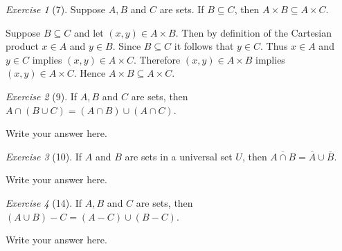 \documentclass[12pt]{amsart}
\makeatletter
\theoremstyle{remark}
\newtheorem*{exercise}{Exercise}%
\renewenvironment{proof}[1][\proofname]{\par\doublespacing
  \pushQED{\qed}%
  \normalfont \topsep6\p@\@plus6\p@\relax
  \list{}{%
    \settowidth{\leftmargin}{\itshape\proofname:\hskip\labelsep}%
    \setlength{\labelwidth}{0pt}%
    \setlength{\itemindent}{-\leftmargin}%
  }%
  \item[\hskip\labelsep\itshape#1\@addpunct{:}]\ignorespaces
}{%
  \popQED\endlist\@endpefalse
  \singlespacing
}
\theoremstyle{mycomment}
\makeatother
\begin{document}
\begin{exercise}[7] Suppose $A,B$ and $C$ are sets. If $B\subseteq C$, then $A\times B\subseteq A\times C$.
\begin{proof}
Suppose $B \subseteq C$ and let $(x,y) \in A \times B$. Then by definition of the Cartesian product $x \in A$ and $y \in B$. Since $B \subseteq C$ it follows that $y \in C$. Thus $x \in A$ and $y \in C$ implies $(x,y) \in A \times C$. Therefore $(x,y) \in A \times B$ implies $(x,y) \in A \times C$. Hence $A \times B \subseteq A \times C$.
\end{proof}
\end{exercise}

\begin{exercise}[9] If $A,B$ and $C$ are sets, then $A\cap(B\cup C)=(A\cap B)\cup (A\cap C)$.
\begin{proof}
Write your answer here.
\end{proof}
\end{exercise}

\begin{exercise}[10] If $A$ and $B$ are sets in a universal set $U$, then $\overline{A\cap B}=\overline A\cup \overline B$.
\begin{proof}
Write your answer here.
\end{proof}
\end{exercise}

\begin{exercise}[14] If $A,B$ and $C$ are sets, then $(A\cup B)-C=(A-C)\cup (B-C)$.
\begin{proof}
Write your answer here.
\end{proof}
\end{exercise}
\end{document}
